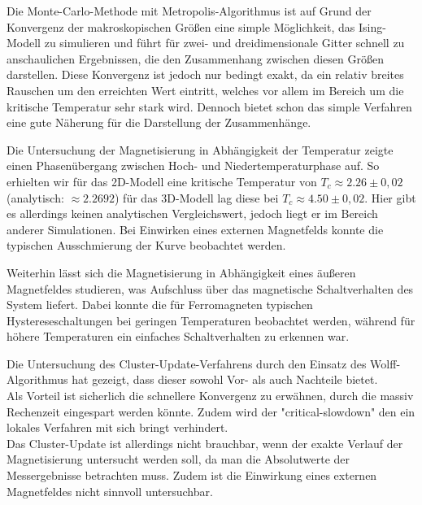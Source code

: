 
Die Monte-Carlo-Methode mit Metropolis-Algorithmus ist auf Grund der Konvergenz der makroskopischen Größen eine simple Möglichkeit, das Ising-Modell zu simulieren und führt für zwei- und dreidimensionale Gitter schnell zu anschaulichen Ergebnissen, die den Zusammenhang zwischen diesen Größen darstellen. Diese Konvergenz ist jedoch nur bedingt exakt, da ein relativ breites Rauschen um den erreichten Wert eintritt, welches vor allem im Bereich um die kritische Temperatur sehr stark wird. Dennoch bietet schon das simple Verfahren eine gute Näherung für die Darstellung der Zusammenhänge.


Die Untersuchung der Magnetisierung in Abhängigkeit der Temperatur zeigte einen Phasenübergang zwischen Hoch- und Niedertemperaturphase auf. So erhielten wir für das 2D-Modell eine kritische Temperatur von $ T_c \approx 2.26 \pm 0,02$ (analytisch: $\approx 2.2692$) für das 3D-Modell lag diese bei $ T_c \approx 4.50 \pm 0,02$. Hier gibt es allerdings keinen analytischen Vergleichswert, jedoch liegt er im Bereich anderer Simulationen. Bei Einwirken eines externen Magnetfelds konnte die typischen Ausschmierung der Kurve beobachtet werden.


Weiterhin lässt sich die Magnetisierung in Abhängigkeit eines äußeren Magnetfeldes studieren, was Aufschluss über das magnetische Schaltverhalten des System liefert. Dabei konnte die für Ferromagneten typischen Hystereseschaltungen bei geringen Temperaturen beobachtet werden, während für höhere Temperaturen ein einfaches Schaltverhalten zu erkennen war.


Die Untersuchung des Cluster-Update-Verfahrens durch den Einsatz des Wolff-Algorithmus hat gezeigt, dass dieser sowohl Vor- als auch Nachteile bietet.\\
Als Vorteil ist sicherlich die schnellere Konvergenz zu erwähnen, durch die massiv Rechenzeit eingespart werden könnte. Zudem wird der "critical-slowdown" den ein lokales Verfahren mit sich bringt verhindert.\\
Das Cluster-Update ist allerdings nicht brauchbar, wenn der exakte Verlauf der Magnetisierung untersucht werden soll, da man die Absolutwerte der Messergebnisse betrachten muss. Zudem ist die Einwirkung eines externen Magnetfeldes nicht sinnvoll untersuchbar.
 
